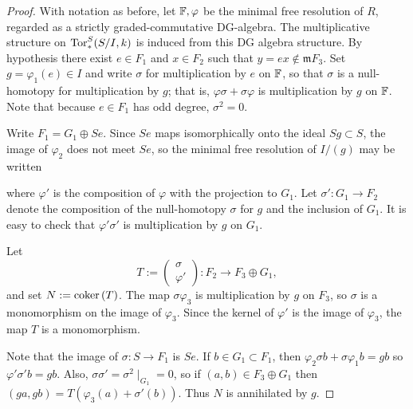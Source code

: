 \documentclass[11pt]{amsart}
\def\phi{{\varphi}}
\def\gm{{\mathfrak m}}
\begin{document}
\begin{proof}
With notation as before, let  $\FF, \phi$  be the minimal free resolution of $R$, regarded as 
a strictly graded-commutative DG-algebra.
The multiplicative structure on $\operatorname{Tor}^{S}_*(S/I,k)$ is induced from this DG algebra structure.
By hypothesis there exist $e\in F_1$ and $x\in F_2$ such that $y = ex \notin \gm F_3$.
Set $g= \phi_1(e) \in I$ and write $\sigma$ for multiplication by $e$ on ${\mathbb F}$, so that 
$\sigma$ is a null-homotopy for multiplication by $g$; that is, $\phi \sigma + \sigma \phi$
is multiplication by $g$ on ${\mathbb F}$. Note that because $e\in F_1$ has odd degree, $\sigma^2 = 0$.

Write $F_1 = G_1\oplus Se$. Since $Se$ maps isomorphically onto the ideal $Sg\subset S$, the image of $\phi_2$
does not meet $Se$, so the
minimal free resolution of $I/(g)$
may be written
\begin{center}
\end{center}
where $\phi'$ is the composition of $\phi$ with the projection to $G_1$. Let $\sigma': G_1 \to F_2$
denote the composition of the null-homotopy $\sigma$ for $g$ and the inclusion of $G_1$. It is easy 
to check that $\phi'\sigma'$ is multiplication by $g$ on $G_1$.

Let
\[
T := \begin{pmatrix}
 \sigma\\\phi'
\end{pmatrix}:  F_{2}\to 
 F_{3} \oplus  G_{1},
\]
and set $N := {\rm{coker}\,}(T)$.
The map $\sigma \phi_3$ is multiplication by $g$ on $F_3$, so $\sigma$ is a monomorphism
on the image of $\phi_3$. Since the kernel of $\phi'$ is the image of $\phi_3$,
the map $T$ is a monomorphism.

Note that the image of $\sigma: S \to F_1$ is $Se$. If $b\in G_1\subset F_1$, then
$\phi_2 \sigma b +\sigma \phi_1 b = gb$ so $\phi'\sigma' b = gb$.
Also, $\sigma\sigma' = \sigma^2\mid_{G_1} =0$, so if $(a,b)\in F_3\oplus G_1$ then
$(ga,gb) = T(\phi_3(a)+\sigma'(b))$. Thus $N$ is annihilated by $g$.


\end{proof}
\end{document}
